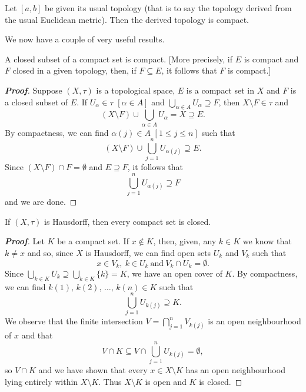 \begin{theorem}\label{T;closed interval compact}
Let $[a,b]$ be given its usual topology
(that is to say the topology derived 
from the usual Euclidean metric).
Then the derived topology is compact.
\end{theorem}

We now have a couple of very useful results.


\begin{theorem}\label{T;closed subset compact}
A closed subset of a compact set is compact.
[More precisely, if $E$ is compact and $F$ closed 
in a given topology, then, if $F\subseteq E$, it follows that
$F$ is compact.]
\end{theorem}
\begin{proof}[\bf Proof] Suppose $(X,\tau)$ is a topological space,
$E$ is a compact set in $X$ and $F$ is a closed subset of $E$.
If $U_{\alpha}\in\tau$ $[\alpha\in A]$ and 
$\bigcup_{\alpha\in A}U_{\alpha}\supseteq F$, then
$X\setminus F\in\tau$ and 
\[(X\setminus F)\cup\bigcup_{\alpha\in A}U_{\alpha}=X\supseteq E.\]
By compactness, we can find $\alpha(j)\in A$
$[1\leq j\leq n]$ such that
\[(X\setminus F)\cup\bigcup_{j=1}^{n}U_{\alpha(j)}\supseteq E.\]
Since $(X\setminus F)\cap F=\emptyset$ and $E\supseteq F$,
it follows that
\[\bigcup_{j=1}^{n}U_{\alpha(j)}\supseteq F\]
and we are done.
\end{proof}


\begin{theorem}\label{T;compact closed}
If $(X,\tau)$ is Hausdorff, then every compact set is closed.
\end{theorem}

\begin{proof}[\bf Proof] Let $K$ be a compact set. If $x\notin K$,
then, given, any $k\in K$ we know that $k\neq x$ and so,
since $X$ is Hausdorff, we can find open sets $U_{k}$
and $V_{k}$ such that
\[x\in V_{k},\ k\in U_{k}\ \text{and}\ V_{k}\cap U_{k}=\emptyset.\]
Since $\bigcup_{k\in K}U_{k}\supseteq\bigcup_{k\in K}\{k\}=K$,
we have an open cover of $K$. By compactness, we can find
$k(1),\,k(2),\,\dots,\,k(n)\in K$ such that 
\[\bigcup_{j=1}^{n}U_{k(j)}\supseteq K.\]
We observe that the finite intersection $V=\bigcap_{j=1}^{n}V_{k(j)}$
is an open neighbourhood of $x$ and that
\[V\cap K\subseteq V\cap\bigcup_{j=1}^{n}U_{k(j)}=\emptyset,\]
so $V\cap K$ and we have shown that every $x\in X\setminus K$ has an
open neighbourhood lying entirely within $X\setminus K$.
Thus $X\setminus K$ is open and $K$ is closed.  
\end{proof}


